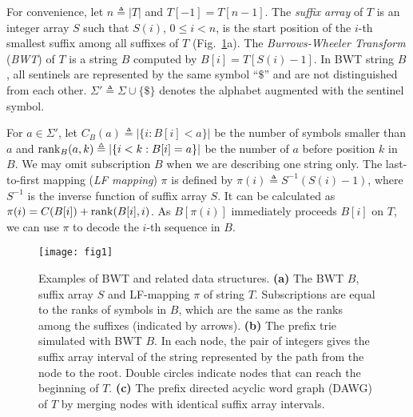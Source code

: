 \documentclass[webpdf,contemporary,large,namedate]{oup-authoring-template}%
\begin{document}
For convenience, let $n\triangleq|T|$ and $T[-1]=T[n-1]$.
The \emph{suffix array} of $T$ is an integer array $S$ such that $S(i)$,
$0\le i<n$, is the start position of the $i$-th smallest suffix among all suffixes of $T$ (Fig.~\ref{fig:1}a).
The \emph{Burrows-Wheeler Transform} (\emph{BWT}) of $T$ is a string $B$ computed by $B[i]=T[S(i)-1]$.
In BWT string $B$, all sentinels are represented by the same symbol ``$\$$'' and are not distinguished from each other.
$\Sigma'\triangleq\Sigma\cup\{\$\}$ denotes the alphabet augmented with the sentinel symbol.

For $a\in\Sigma'$, let $C_B(a)\triangleq|\{i:B[i]<a\}|$ be the number of symbols smaller than $a$
and ${\rm rank}_B(a,k)\triangleq|\{i<k:B[i]=a\}|$ be the number of $a$ before position $k$ in $B$.
We may omit subscription $B$ when we are describing one string only.
The last-to-first mapping (\emph{LF mapping}) $\pi$ is defined by $\pi(i)\triangleq S^{-1}(S(i)-1)$,
where $S^{-1}$ is the inverse function of suffix array $S$.
It can be calculated as $\pi(i)=C(B[i])+{\rm rank}(B[i],i)$.
As $B[\pi(i)]$ immediately proceeds $B[i]$ on $T$, we can use $\pi$ to decode the $i$-th sequence in $B$.

\begin{figure}[bt]
\centering
\texttt{[image: fig1]}
\caption{Examples of BWT and related data structures.
{\bf (a)} The BWT $B$, suffix array $S$ and LF-mapping $\pi$ of string $T$.
Subscriptions are equal to the ranks of symbols in $B$, which are the same as the ranks among the suffixes (indicated by arrows).
{\bf (b)} The prefix trie simulated with BWT $B$.
In each node, the pair of integers gives the suffix array interval of the string represented by the path from the node to the root.
Double circles indicate nodes that can reach the beginning of $T$.
{\bf (c)} The prefix directed acyclic word graph (DAWG) of $T$ by merging nodes with identical suffix array intervals.}\label{fig:1}
\end{figure}

\end{document}
